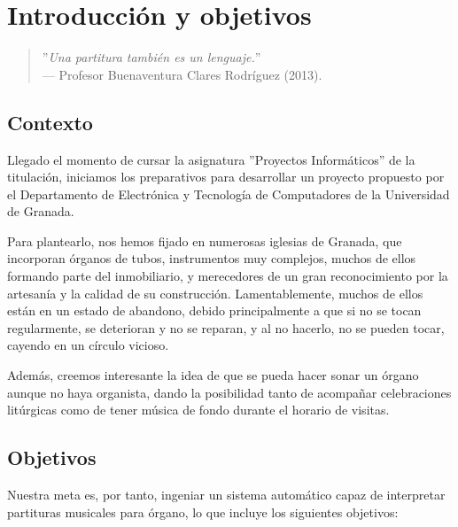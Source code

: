 \chapter{Introducción y objetivos}
\label{cap:capitulo_1}

\begin{quote}
	\small \flushright ''\textit{Una partitura también es un lenguaje.}'' \\
	--- Profesor Buenaventura Clares Rodríguez (2013).
\end{quote}

\section{Contexto}

Llegado el momento de cursar la asignatura ''Proyectos Informáticos'' de la titulación, iniciamos los preparativos para desarrollar un proyecto propuesto por el Departamento de Electrónica y Tecnología de Computadores de la Universidad de Granada.

Para plantearlo, nos hemos fijado en numerosas iglesias de Granada, que incorporan órganos de tubos, instrumentos muy complejos, muchos de ellos formando parte del inmobiliario, y merecedores de un gran reconocimiento por la artesanía y la calidad de su construcción. Lamentablemente, muchos de ellos están en un estado de abandono, debido principalmente a que si no se tocan regularmente, se deterioran y no se reparan, y al no hacerlo, no se pueden tocar, cayendo en un círculo vicioso.

Además, creemos interesante la idea de que se pueda hacer sonar un órgano aunque no haya organista, dando la posibilidad tanto de acompañar celebraciones litúrgicas como de tener música de fondo durante el horario de visitas.

\newpage

\section{Objetivos}


Nuestra meta es, por tanto, ingeniar un sistema automático capaz de interpretar partituras musicales para órgano, lo que incluye los siguientes objetivos:

